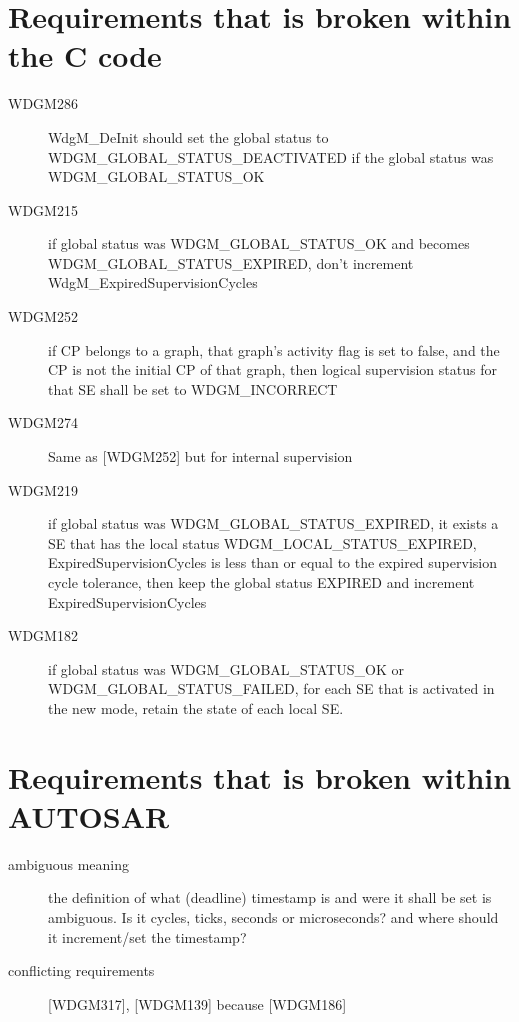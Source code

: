 \documentclass[11pt,a4paper]{article}
\begin{document}
\section{Requirements that is broken within the C code}
\begin{description}
  \item[WDGM286] \parbox[t]{0.8\linewidth}{WdgM\_DeInit should set the global
      status to WDGM\_GLOBAL\_STATUS\_DEACTIVATED if the global status was
    WDGM\_GLOBAL\_STATUS\_OK}
  \item[WDGM215] \parbox[t]{0.8\linewidth}{if global status was
      WDGM\_GLOBAL\_STATUS\_OK and becomes WDGM\_GLOBAL\_STATUS\_EXPIRED, don't
      increment WdgM\_ExpiredSupervisionCycles}
  \item[WDGM252] \parbox[t]{0.8\linewidth}{if CP belongs to a graph, that
      graph's activity flag is set to false, and the CP is not the initial CP of
      that graph, then logical supervision status for that SE shall be set to
      WDGM\_INCORRECT}
  \item[WDGM274] \parbox[t]{0.8\linewidth}{Same as [WDGM252] but for internal
      supervision}
  \item[WDGM219] \parbox[t]{0.8\linewidth}{if global status was
      WDGM\_GLOBAL\_STATUS\_EXPIRED, it exists a SE that has the local status
      WDGM\_LOCAL\_STATUS\_EXPIRED, ExpiredSupervisionCycles is less than or
      equal to the expired supervision cycle tolerance, then keep the global
      status EXPIRED and increment ExpiredSupervisionCycles}
  \item[WDGM182] \parbox[t]{0.8\linewidth}{if global status was WDGM\_GLOBAL\_STATUS\_OK or
    WDGM\_GLOBAL\_STATUS\_FAILED, for each SE that is activated in the new mode,
    retain the state of each local SE.}
\end{description}

\section{Requirements that is broken within AUTOSAR}
\begin{description}
  \item[ambiguous meaning] the definition of what (deadline) timestamp is and were it shall
    be set is ambiguous. Is it cycles, ticks, seconds or microseconds? and where
    should it increment/set the timestamp?
  \item[conflicting requirements] [WDGM317], [WDGM139] because [WDGM186]
\end{description}
\end{document}
